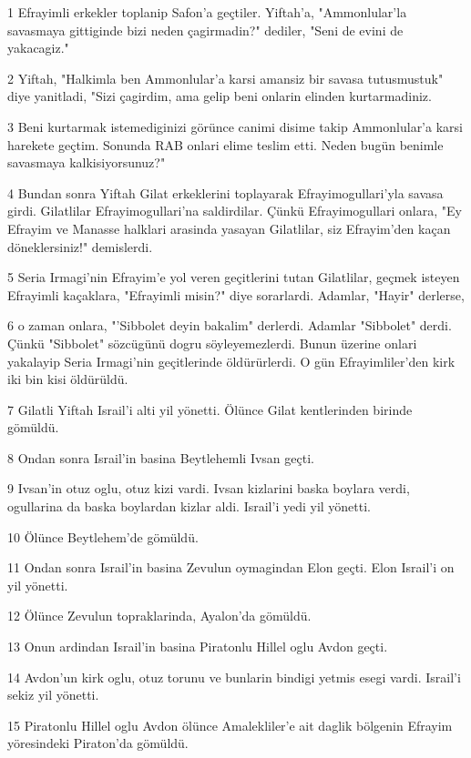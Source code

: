 \par 1 Efrayimli erkekler toplanip Safon'a geçtiler. Yiftah'a, "Ammonlular'la savasmaya gittiginde bizi neden çagirmadin?" dediler, "Seni de evini de yakacagiz."
\par 2 Yiftah, "Halkimla ben Ammonlular'a karsi amansiz bir savasa tutusmustuk" diye yanitladi, "Sizi çagirdim, ama gelip beni onlarin elinden kurtarmadiniz.
\par 3 Beni kurtarmak istemediginizi görünce canimi disime takip Ammonlular'a karsi harekete geçtim. Sonunda RAB onlari elime teslim etti. Neden bugün benimle savasmaya kalkisiyorsunuz?"
\par 4 Bundan sonra Yiftah Gilat erkeklerini toplayarak Efrayimogullari'yla savasa girdi. Gilatlilar Efrayimogullari'na saldirdilar. Çünkü Efrayimogullari onlara, "Ey Efrayim ve Manasse halklari arasinda yasayan Gilatlilar, siz Efrayim'den kaçan döneklersiniz!" demislerdi.
\par 5 Seria Irmagi'nin Efrayim'e yol veren geçitlerini tutan Gilatlilar, geçmek isteyen Efrayimli kaçaklara, "Efrayimli misin?" diye sorarlardi. Adamlar, "Hayir" derlerse,
\par 6 o zaman onlara, "'Sibbolet deyin bakalim" derlerdi. Adamlar "Sibbolet" derdi. Çünkü "Sibbolet" sözcügünü dogru söyleyemezlerdi. Bunun üzerine onlari yakalayip Seria Irmagi'nin geçitlerinde öldürürlerdi. O gün Efrayimliler'den kirk iki bin kisi öldürüldü.
\par 7 Gilatli Yiftah Israil'i alti yil yönetti. Ölünce Gilat kentlerinden birinde gömüldü.
\par 8 Ondan sonra Israil'in basina Beytlehemli Ivsan geçti.
\par 9 Ivsan'in otuz oglu, otuz kizi vardi. Ivsan kizlarini baska boylara verdi, ogullarina da baska boylardan kizlar aldi. Israil'i yedi yil yönetti.
\par 10 Ölünce Beytlehem'de gömüldü.
\par 11 Ondan sonra Israil'in basina Zevulun oymagindan Elon geçti. Elon Israil'i on yil yönetti.
\par 12 Ölünce Zevulun topraklarinda, Ayalon'da gömüldü.
\par 13 Onun ardindan Israil'in basina Piratonlu Hillel oglu Avdon geçti.
\par 14 Avdon'un kirk oglu, otuz torunu ve bunlarin bindigi yetmis esegi vardi. Israil'i sekiz yil yönetti.
\par 15 Piratonlu Hillel oglu Avdon ölünce Amalekliler'e ait daglik bölgenin Efrayim yöresindeki Piraton'da gömüldü.

